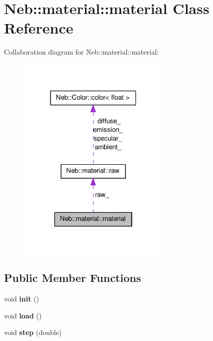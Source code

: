 \hypertarget{classNeb_1_1material_1_1material}{\section{\-Neb\-:\-:material\-:\-:material \-Class \-Reference}
\label{classNeb_1_1material_1_1material}
}


\-Collaboration diagram for \-Neb\-:\-:material\-:\-:material\-:\nopagebreak
\begin{figure}[H]
\begin{center}
\leavevmode
\includegraphics[width=208pt]{classNeb_1_1material_1_1material__coll__graph}
\end{center}
\end{figure}
\subsection*{\-Public \-Member \-Functions}
\begin{DoxyCompactItemize}
\item 
\hypertarget{classNeb_1_1material_1_1material_ab5d6f13137fb8d7fe5a591b426db6ac5}{void {\bfseries init} ()}\label{classNeb_1_1material_1_1material_ab5d6f13137fb8d7fe5a591b426db6ac5}

\item 
\hypertarget{classNeb_1_1material_1_1material_adcac6665af9b5370b2ba1f9ea909df0d}{void {\bfseries load} ()}\label{classNeb_1_1material_1_1material_adcac6665af9b5370b2ba1f9ea909df0d}

\item 
\hypertarget{classNeb_1_1material_1_1material_a19703d401881b74470f89eada4fa4341}{void {\bfseries step} (double)}\label{classNeb_1_1material_1_1material_a19703d401881b74470f89eada4fa4341}

\end{DoxyCompactItemize}
